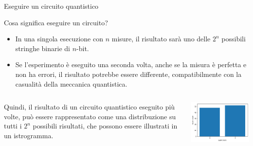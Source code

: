 \documentclass{beamer}
\renewcommand{\'}[0]{\`}
\newcommand{\backupend}{
   \setcounter{framenumber}{\value{finalframe}}
}
\begin{document}
	\begin{frame}{Eseguire un circuito quantistico}
	
	Cosa significa eseguire un circuito? 
	\vspace{0.3cm}
	
	\begin{itemize}
	\item In una singola esecuzione con $n$ misure, il risultato sarà uno delle $2^n$ possibili stringhe binarie di $n$-bit. 
	\item Se l'esperimento è eseguito una seconda volta, anche se la misura è perfetta e non ha errori, il risultato potrebbe essere differente, compatibilmente con la casualità della 	meccanica quantistica. 
	\end{itemize}

	\vspace{0.3cm}
		
	\begin{columns}
	
	
	\vspace{-0.3cm}
	Quindi, il risultato di un circuito quantistico eseguito più volte, può essere rappresentato come una distribuzione su tutti i \alert{$2^n$ possibili risultati}, che possono essere illustrati in un istrogramma. 
		
	
	\vspace{-0.3cm}
	\centering \includegraphics[width=1\textwidth]{./image/Cirq_GHZ_Histogram.png} 


	\end{columns}

	
	\end{frame}


\backupend





	
\end{document}
